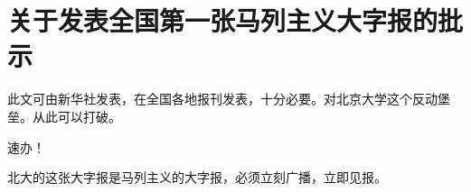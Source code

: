 \section[关于发表全国第一张马列主义大字报的批示（一九六六年六月一日）]{关于发表全国第一张马列主义大字报的批示}


此文可由新华社发表，在全国各地报刊发表，十分必要。对北京大学这个反动堡垒。从此可以打破。

速办！

北大的这张大字报是马列主义的大字报，必须立刻广播，立即见报。


